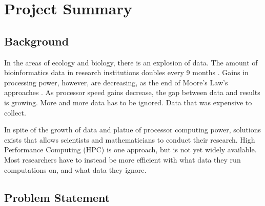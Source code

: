

 


\section{Project Summary}

\subsection{Background}

In the areas of ecology and biology, there is an explosion of data. The
amount of bioinformatics data in research institutions doubles every 9 months 
\cite{james}. Gains in processing power, however, are decreasing, as the end
of Moore's Law's approaches \cite{gordon_moore}. As processor speed gains decrease, 
the gap between data and results is growing. More and more data has 
to be ignored. Data that was expensive to collect.

In spite of the growth of data and platue of processor computing power, solutions 
exists that allows scientists and mathematicians to conduct their 
research. High Performance Computing (HPC) is one approach, but is not yet widely
available. Most researchers have to instead be more efficient with what data they 
run computations on, and what data they ignore.

\subsection{Problem Statement}

